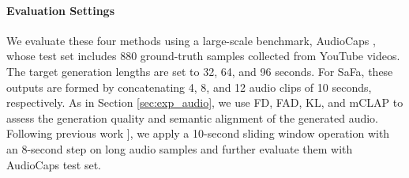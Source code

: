 
\vspace{-10pt}
\paragraph{Evaluation Settings}
We evaluate these four methods using a large-scale benchmark, AudioCaps \cite{kim2019audiocaps}, whose test set includes 880 ground-truth samples collected from YouTube videos. The target generation lengths are set to 32, 64, and 96 seconds. For SaFa, these outputs are formed by concatenating 4, 8, and 12 audio clips of 10 seconds, respectively. As in Section \ref{sec:exp_audio}, we use FD, FAD, KL, and mCLAP to assess the generation quality and semantic alignment of the generated audio. Following previous work \cite{Evans2024FastTL}], we apply a 10-second sliding window operation with an 8-second step on long audio samples and further evaluate them with AudioCaps test set.


